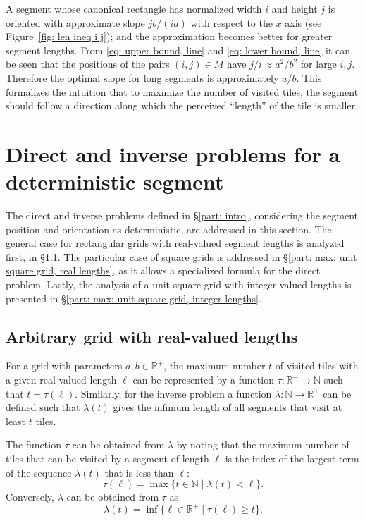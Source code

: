 \documentclass[12pt, a4paper]{article}
\newcommand{\st}{\mid}%
\newcommand{\funt}{\tau} %
\newcommand{\funl}{\lambda} %
\newcommand{\len}{\ell} %
\newcommand{\tiles}{t} %
\newcommand{\mss}{M}
\begin{document}
A segment whose canonical rectangle has normalized width $i$ and height $j$ is oriented with approximate slope $jb/(ia)$ with respect to the $x$ axis (see Figure~\ref{fig: len ineq i j}); and the approximation becomes better for greater segment lengths. From \eqref{eq: upper bound, line} and \eqref{eq: lower bound, line} it can be seen that the positions of the pairs $(i,j) \in \mss$ have $j/i \approx a^2/b^2$ for large $i, j$. Therefore the optimal slope for long segments is approximately $a/b$. This formalizes the intuition that to maximize the number of visited tiles, the segment should follow a direction along which the perceived ``length'' of the tile is smaller.


\section{Direct and inverse problems for a deterministic segment}
\label{part: max}

The direct and inverse problems defined in \S\ref{part: intro}, considering the segment position and orientation as deterministic, are addressed in this section. The general case for rectangular grids with real-valued segment lengths is analyzed first, in \S\ref{part: max: arbitrary grid, real lengths}. The particular case of square grids is addressed in \S\ref{part: max: unit square grid, real lengths}, as it allows a specialized formula for the direct problem. Lastly, the analysis of a unit square grid with integer-valued lengths is presented in \S\ref{part: max: unit square grid, integer lengths}.


\subsection{Arbitrary grid with real-valued lengths}
\label{part: max: arbitrary grid, real lengths}

For a grid with parameters $a, b \in \mathbb R^+$, the maximum number $\tiles$ of visited tiles with a given real-valued length $\len$ can be represented by a function $\funt: \mathbb R^+ \to \mathbb N$ such that $\tiles = \funt(\len)$. Similarly, for the inverse problem a function $\funl: \mathbb N \to \mathbb R^+$ can be defined such that $\funl(\tiles)$ gives the infimum length of all segments that visit at least $\tiles$ tiles.

The function $\funt$ can be obtained from $\funl$ by noting that the maximum number of tiles that can be visited by a segment of length $\len$ is the index of the largest term of the sequence $\funl(\tiles)$ that is less than $\len$:
\begin{equation}
\label{eq: funt funl}
\funt(\len) = \max \{\tiles \in \mathbb N \st \funl(\tiles)<\len\}.
\end{equation}
Conversely, $\funl$ can be obtained from $\funt$ as
\begin{equation}
\label{eq: funl funt}
\funl(\tiles) = \inf\{\len \in \mathbb R^+ \st \funt(\len) \geq \tiles\}.
\end{equation}
\end{document}
